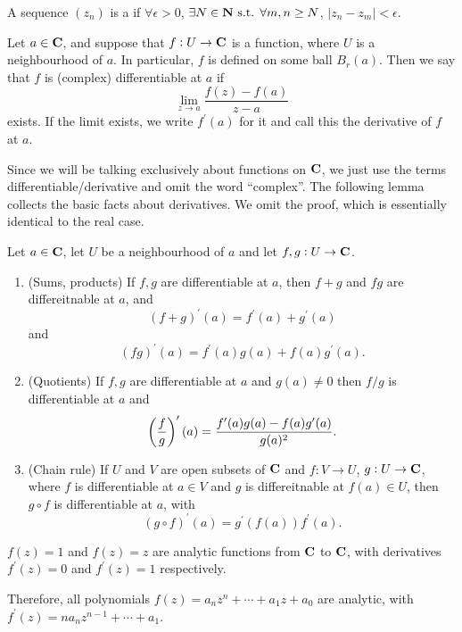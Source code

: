 \begin{definition}
A sequence $(z_n)$ is a  if $\forall\epsilon>0$, $\exists N\in\mathbf N\text{ s.t. }\forall m,n\ge N$, $|z_n-z_m|<\epsilon$.
\end{definition}


\begin{definition}
Let $a\in\mathbf C$, and suppose that $f:U\to\mathbf C$ is a function, where $U$ is a neighbourhood of $a$. In particular, $f$ is defined on some ball $B_r(a)$. Then we say that $f$ is (complex) differentiable at $a$ if
\[\lim_{z\to a}\frac{f(z)-f(a)}{z-a}\]
exists. If the limit exists, we write $f^\prime(a)$ for it and call this the derivative of $f$ at $a$.
\end{definition}

Since we will be talking exclusively about functions on $\mathbf C$, we just use the terms differentiable/derivative and omit the word ``complex''. The following lemma collects the basic facts about derivatives. We omit the proof, which is essentially identical to the real case.

\begin{lemma}
Let $a\in\mathbf C$, let $U$ be a neighbourhood of $a$ and let $f,g:U\to\mathbf C$.
\begin{enumerate}[label=(\arabic*)]
\item (Sums, products) If $f,g$ are differentiable at $a$, then $f+g$ and $fg$ are differeitnable at $a$, and
\[(f+g)^\prime(a)=f^\prime(a)+g^\prime(a)\]
and
\[(fg)^\prime(a)=f^\prime(a)g(a)+f(a)g^\prime(a).\]
\item (Quotients) If $f,g$ are differentiable at $a$ and $g(a)\neq0$ then $f/g$ is differentiable at $a$ and
\[\left(\frac{f}{g}\right)^\prime(a)=\frac{f^\prime(a)g(a)-f(a)g^\prime(a)}{g(a)^2}.\]
\item (Chain rule) If $U$ and $V$ are open subsets of $\mathbf C$ and $f:V\to U$, $g:U\to\mathbf C$, where $f$ is differentiable at $a\in V$ and $g$ is differeitnable at $f(a)\in U$, then $g\circ f$ is differentiable at $a$, with
\[(g\circ f)^\prime(a)=g^\prime(f(a))f^\prime(a).\]
\end{enumerate}
\end{lemma}

\begin{example}
$f(z)=1$ and $f(z)=z$ are analytic functions from $\mathbf C$ to $\mathbf C$, with derivatives $f^\prime(z)=0$ and $f^\prime(z)=1$ respectively.

Therefore, all polynomials $f(z)=a_nz^n+\cdots+a_1z+a_0$ are analytic, with $f^\prime(z)=na_nz^{n-1}+\cdots+a_1$.
\end{example}


